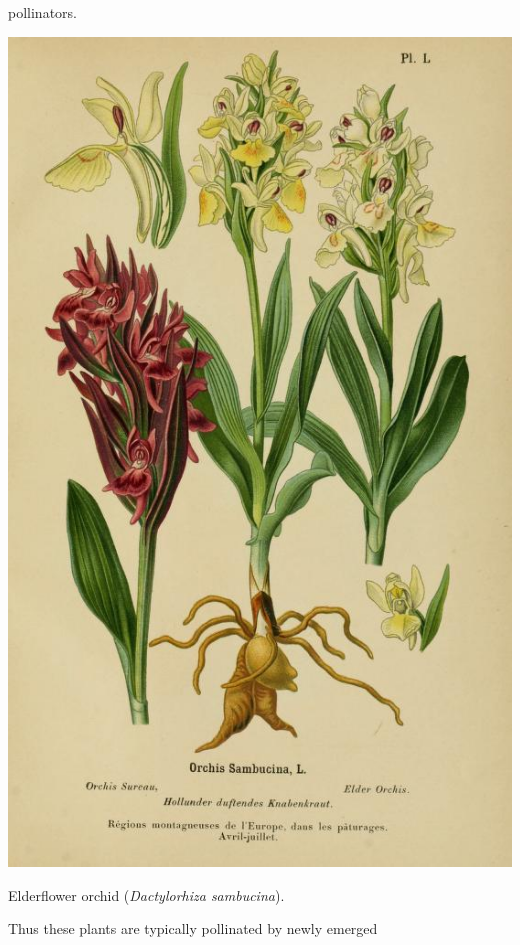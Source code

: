 pollinators. \begin{marginfigure}
\begin{center}
  \includegraphics[width = \textwidth]{illustration_images/single_locus_selection/Elderflower_orchid/albumdesorchid1899corr_0209.jpg}
\end{center}
\caption{Elderflower orchid ({\it Dactylorhiza
  sambucina}).  } \label{fig:ElderflowerOrchid}  %
\end{marginfigure} Thus these plants are typically pollinated by newly emerged
